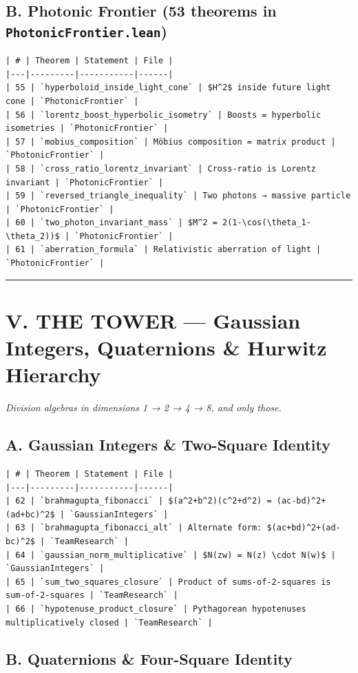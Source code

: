 \documentclass[12pt,a4paper,openany]{book}
\begin{document}
\subsection{B. Photonic Frontier (53 theorems in \texttt{PhotonicFrontier.lean})}

\begin{verbatim}
| # | Theorem | Statement | File |
|---|---------|-----------|------|
| 55 | `hyperboloid_inside_light_cone` | $H^2$ inside future light cone | `PhotonicFrontier` |
| 56 | `lorentz_boost_hyperbolic_isometry` | Boosts = hyperbolic isometries | `PhotonicFrontier` |
| 57 | `mobius_composition` | Möbius composition = matrix product | `PhotonicFrontier` |
| 58 | `cross_ratio_lorentz_invariant` | Cross-ratio is Lorentz invariant | `PhotonicFrontier` |
| 59 | `reversed_triangle_inequality` | Two photons → massive particle | `PhotonicFrontier` |
| 60 | `two_photon_invariant_mass` | $M^2 = 2(1-\cos(\theta_1-\theta_2))$ | `PhotonicFrontier` |
| 61 | `aberration_formula` | Relativistic aberration of light | `PhotonicFrontier` |
\end{verbatim}

\bigskip\hrule\bigskip

\section{V. THE TOWER — Gaussian Integers, Quaternions \& Hurwitz Hierarchy}

\textit{Division algebras in dimensions 1 → 2 → 4 → 8, and only those.}

\subsection{A. Gaussian Integers \& Two-Square Identity}

\begin{verbatim}
| # | Theorem | Statement | File |
|---|---------|-----------|------|
| 62 | `brahmagupta_fibonacci` | $(a^2+b^2)(c^2+d^2) = (ac-bd)^2+(ad+bc)^2$ | `GaussianIntegers` |
| 63 | `brahmagupta_fibonacci_alt` | Alternate form: $(ac+bd)^2+(ad-bc)^2$ | `TeamResearch` |
| 64 | `gaussian_norm_multiplicative` | $N(zw) = N(z) \cdot N(w)$ | `GaussianIntegers` |
| 65 | `sum_two_squares_closure` | Product of sums-of-2-squares is sum-of-2-squares | `TeamResearch` |
| 66 | `hypotenuse_product_closure` | Pythagorean hypotenuses multiplicatively closed | `TeamResearch` |
\end{verbatim}

\subsection{B. Quaternions \& Four-Square Identity}
\end{document}
